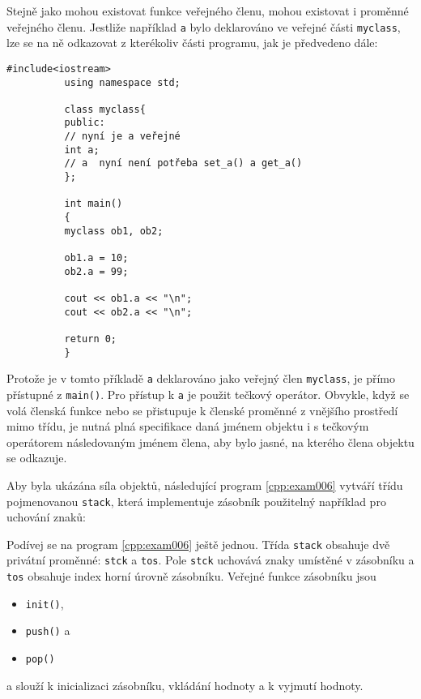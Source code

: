       Stejně jako mohou existovat funkce veřejného členu, mohou existovat i proměnné veřejného 
      členu. Jestliže například \lstinline[style=luaCPPText]!a! bylo deklarováno ve veřejné 
      části \lstinline[style=luaCPPText]!myclass!, lze se na ně odkazovat z kterékoliv části 
      programu, jak je předvedeno dále:
        \begin{lstlisting}[style=luaCPPStyle]
          #include<iostream>
          using namespace std;
  
          class myclass{
          public:
          // nyní je a veřejné
          int a;
          // a  nyní není potřeba set_a() a get_a()
          };
  
          int main()
          {
          myclass ob1, ob2;
  
          ob1.a = 10;
          ob2.a = 99;
  
          cout << ob1.a << "\n";
          cout << ob2.a << "\n";
  
          return 0;
          }
        \end{lstlisting}
      Protože je v tomto příkladě \lstinline[style=luaCPPText]!a! deklarováno jako veřejný 
      člen \lstinline[style=luaCPPText]!myclass!, je přímo přístupné z 
      \lstinline[style=luaCPPText]!main()!. Pro přístup k \lstinline[style=luaCPPText]!a! 
      je použit tečkový operátor. Obvykle, když se volá členská funkce nebo se přistupuje k 
      členské proměnné z vnějšího prostředí mimo třídu, je nutná plná specifikace daná jménem 
      objektu i s tečkovým operátorem následovaným jménem člena, aby bylo jasné, na kterého člena 
      objektu se odkazuje.

      Aby byla ukázána síla objektů, následující program \ref{cpp:exam006} vytváří třídu
      pojmenovanou \lstinline[style=luaCPPText]!stack!, která implementuje zásobník použitelný
      například pro uchování znaků:

      

      Podívej se na program \ref{cpp:exam006} ještě jednou. Třída
      \lstinline[style=luaCPPText]!stack! obsahuje dvě privátní proměnné:
      \lstinline[style=luaCPPText]!stck! a \lstinline[style=luaCPPText]!tos!. Pole
      \lstinline[style=luaCPPText]!stck! uchovává znaky umístěné v zásobníku a
      \lstinline[style=luaCPPText]!tos! obsahuje index horní úrovně zásobníku. Veřejné funkce
      zásobníku jsou 
      \begin{itemize}[noitemsep]
        \item \lstinline[style=luaCPPText]!init()!,
        \item \lstinline[style=luaCPPText]!push()! a
        \item \lstinline[style=luaCPPText]!pop()!
      \end{itemize}       
      a slouží k inicializaci zásobníku, vkládání hodnoty a k vyjmutí hodnoty. 
      
